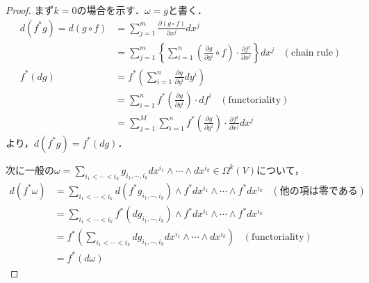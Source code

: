 \documentclass[uplatex, dvipdfmx]{jsreport}
\begin{document}
\begin{proof}
    まず$k=0$の場合を示す．$\omega=g$と書く．
    \begin{align*}
        d(f^*g) = d(g\circ f) &= \sum^m_{j=1}\frac{\partial (g\circ f)}{\partial x^j}dx^j \\
        &= \sum^m_{j=1}\left\{\sum^n_{i=1}\left(\frac{\partial g}{\partial y^i}\circ f\right)\cdot \frac{\partial f^i}{\partial x^j}\right\}dx^j \;\;\;\mathrm{(chain\;rule)} \\
        f^*(dg) &= f^*\left( \sum^n_{i=1}\frac{\partial g}{\partial y^i}dy^i \right) \\
        &= \sum^n_{i=1}f^*\left(\frac{\partial g}{\partial y^i}\right)\cdot df^i\;\;\;\mathrm{(functoriality)} \\
        &= \sum^M_{j=1}\sum^n_{i=1}f^*\left(\frac{\partial g}{\partial y^i}\right)\cdot\frac{\partial f^i}{\partial x^j}dx^j
    \end{align*}
    より，$d(f^*g)=f^*(dg)$．

    次に一般の$\omega=\sum_{i_1<\cdots<i_k}g_{i_1,\cdots,i_k}dx^{i_1}\wedge\cdots\wedge dx^{i_k}\in\Omega^k(V)$について，
    \begin{align*}
        d(f^*\omega) &= \sum_{i_1<\cdots<i_k}d(f^*g_{i_1,\cdots,i_k})\wedge f^*dx^{i_1}\wedge\cdots\wedge f^*dx^{i_k} \;\;\;(他の項は零である) \\
        &= \sum_{i_1<\cdots<i_k}f^*(dg_{i_1,\cdots,i_k})\wedge f^*dx^{i_1}\wedge\cdots\wedge f^*dx^{i_k} \\
        &= f^*\left( \sum_{i_1<\cdots<i_k}dg_{i_1,\cdots,i_k}dx^{i_1}\wedge\cdots\wedge dx^{i_k} \right) \;\;\;\mathrm{(functoriality)} \\
        &= f^*(d\omega)
    \end{align*}
\end{proof}
\end{document}
